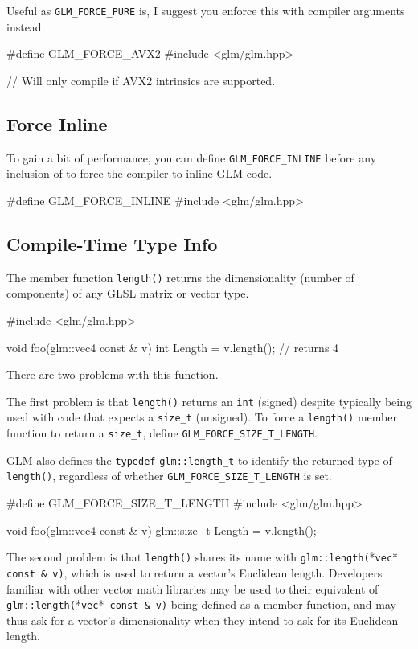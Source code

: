 \documentclass{scrartcl}
\numberwithin{figure}{subsection}
\begin{document}
Useful as \verb|GLM_FORCE_PURE| is, I suggest you enforce this with compiler arguments instead.

\begin{cppcode}
#define GLM_FORCE_AVX2
#include <glm/glm.hpp>

// Will only compile if AVX2 intrinsics are supported.
\end{cppcode}

\subsection{Force Inline}
To gain a bit of performance, you can define \verb|GLM_FORCE_INLINE| before any inclusion of  to force the compiler to inline GLM code.

\begin{cppcode}
#define GLM_FORCE_INLINE 
#include <glm/glm.hpp>
\end{cppcode}

\subsection{Compile-Time Type Info}
The member function \verb|length()| returns the dimensionality (number of components) of any GLSL matrix or vector type.

\begin{cppcode}
#include <glm/glm.hpp>

void foo(glm::vec4 const & v)
{
  int Length = v.length();  // returns 4
}
\end{cppcode}

There are two problems with this function.

The first problem is that \verb|length()| returns an \verb|int| (signed) despite typically being used with code that expects a \verb|size_t| (unsigned). To force a \verb|length()| member function to return a \verb|size_t|, define \verb|GLM_FORCE_SIZE_T_LENGTH|.

GLM also defines the \verb|typedef| \verb|glm::length_t| to identify the returned type of \verb|length()|, regardless of whether \verb|GLM_FORCE_SIZE_T_LENGTH| is set.

\begin{cppcode}
#define GLM_FORCE_SIZE_T_LENGTH 
#include <glm/glm.hpp>

void foo(glm::vec4 const & v)
{
  glm::size_t Length = v.length();
}
\end{cppcode}

The second problem is that \verb|length()| shares its name with \verb|glm::length(|*\verb|vec|*\verb| const & v)|, which is used to return a vector's Euclidean length. Developers familiar with other vector math libraries may be used to their equivalent of \verb|glm::length(|*\verb|vec|*\verb| const & v)| being defined as a member function, and may thus ask for a vector's dimensionality when they intend to ask for its Euclidean length.
\end{document}
